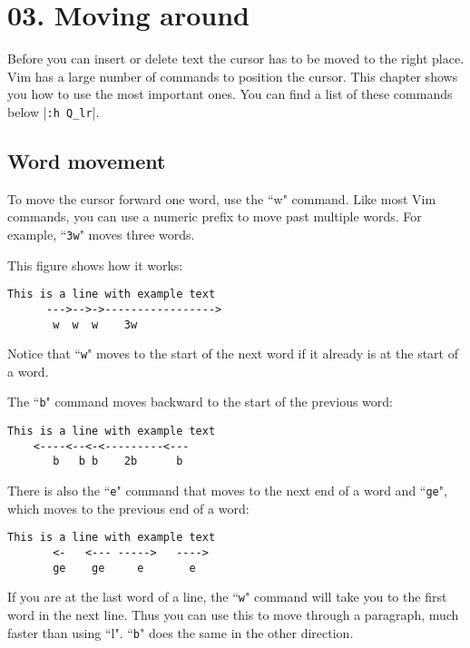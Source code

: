 \section{03. Moving around}
Before you can insert or delete text the cursor has to be moved to the right
place.  Vim has a large number of commands to position the cursor.  This
chapter shows you how to use the most important ones.  You can find a list of
these commands below |\texttt{:h Q\_lr}|.
\localtableofcontents
\subsection{Word movement}

To move the cursor forward one word, use the ``w" command.
Like most Vim commands, you can use a numeric prefix to move past multiple words.
For example, ``\texttt{3w}" moves three words.

This figure shows how it works:

		\begin{Verbatim}[samepage=true]
    This is a line with example text
      --->-->->----------------->
       w  w  w    3w
		\end{Verbatim}

Notice that ``\texttt{w}" moves to the start of the next word if it already is at the start of a word.

The ``\texttt{b}" command moves backward to the start of the previous word:

		\begin{Verbatim}[samepage=true]
    This is a line with example text
    <----<--<-<---------<---
       b   b b    2b      b
		\end{Verbatim}

There is also the ``\texttt{e}" command that moves to the next end of a word and ``\texttt{ge}", which moves to the previous end of a word:

		\begin{Verbatim}[samepage=true]
    This is a line with example text
       <-   <--- ----->   ---->
       ge    ge     e       e
		\end{Verbatim}

If you are at the last word of a line, the ``\texttt{w}" command will take you to the first word in the next line.
Thus you can use this to move through a paragraph, much faster than using ``l".
``\texttt{b}" does the same in the other direction.

